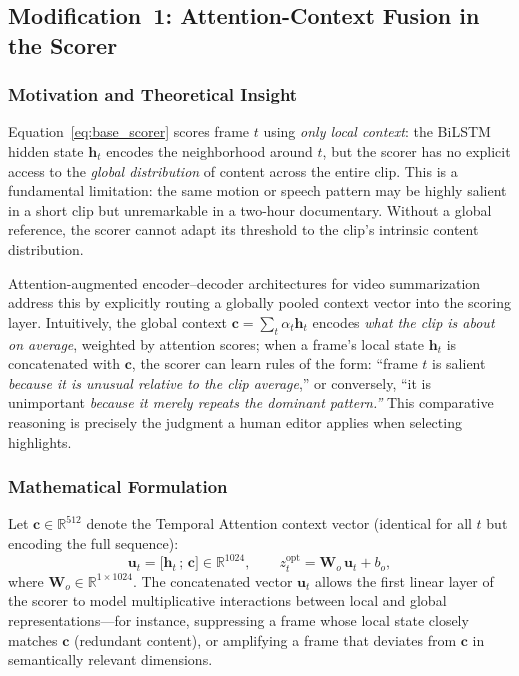 \documentclass[10pt,conference]{IEEEtran}
\begin{document}
\subsection{Modification~1: Attention-Context Fusion in the Scorer}

\subsubsection{Motivation and Theoretical Insight}

Equation~\eqref{eq:base_scorer} scores frame $t$ using \emph{only local
context}: the BiLSTM hidden state $\mathbf{h}_t$ encodes the neighborhood
around $t$, but the scorer has no explicit access to the \emph{global
distribution} of content across the entire clip. This is a fundamental
limitation: the same motion or speech pattern may be highly salient in a
short clip but unremarkable in a two-hour documentary. Without a global
reference, the scorer cannot adapt its threshold to the clip's intrinsic
content distribution.

Attention-augmented encoder--decoder architectures for video
summarization~\cite{ji2017attention,fajtl2018} address this by explicitly
routing a globally pooled context vector into the scoring layer. Intuitively,
the global context $\mathbf{c} = \sum_t \alpha_t \mathbf{h}_t$ encodes
\emph{what the clip is about on average}, weighted by attention scores; when
a frame's local state $\mathbf{h}_t$ is concatenated with $\mathbf{c}$, the
scorer can learn rules of the form: ``frame $t$ is salient \emph{because it
is unusual relative to the clip average},'' or conversely, ``it is
unimportant \emph{because it merely repeats the dominant pattern.''} This
comparative reasoning is precisely the judgment a human editor applies when
selecting highlights.

\subsubsection{Mathematical Formulation}

Let $\mathbf{c} \in \mathbb{R}^{512}$ denote the Temporal Attention context
vector (identical for all $t$ but encoding the full sequence):
\begin{equation}
  \mathbf{u}_t = \bigl[\mathbf{h}_t \,;\, \mathbf{c}\bigr]
               \in \mathbb{R}^{1024},
  \qquad
  z_t^{\text{opt}} = \mathbf{W}_o\,\mathbf{u}_t + b_o,
  \label{eq:fuse}
\end{equation}
where $\mathbf{W}_o \in \mathbb{R}^{1 \times 1024}$. The concatenated vector
$\mathbf{u}_t$ allows the first linear layer of the scorer to model
multiplicative interactions between local and global representations---for
instance, suppressing a frame whose local state closely matches $\mathbf{c}$
(redundant content), or amplifying a frame that deviates from $\mathbf{c}$
in semantically relevant dimensions.
\end{document}
